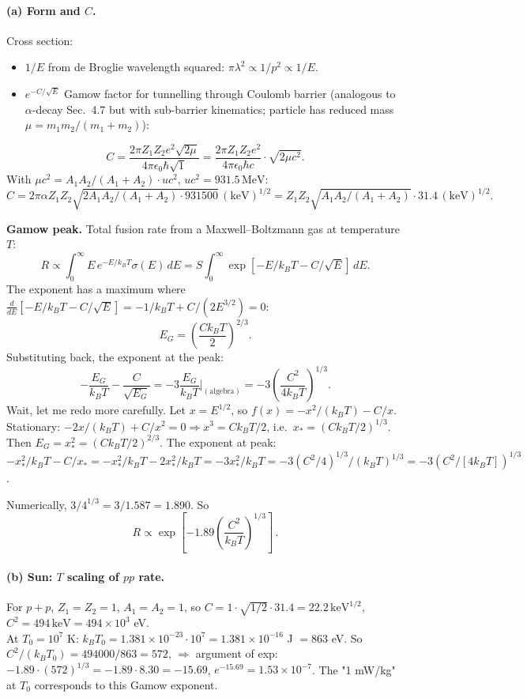 \documentclass[11pt]{article}
\newcommand{\MeV}{\,\mathrm{MeV}}
\begin{document}
\paragraph{(a) Form and $C$.} Cross section:
\begin{itemize}[itemsep=1pt]
\item $1/E$ from de Broglie wavelength squared: $\pi\lambda^{2}\propto 1/p^{2}\propto 1/E$.
\item $e^{-C/\sqrt E}$ Gamow factor for tunnelling through Coulomb barrier (analogous to $\alpha$-decay Sec.\ 4.7 but with sub-barrier kinematics; particle has reduced mass $\mu=m_1 m_2/(m_1+m_2)$):
\end{itemize}
\[
C=\frac{2\pi Z_1 Z_2 e^{2}\sqrt{2\mu}}{4\pi\epsilon_{0}\hbar\sqrt{1}}=\frac{2\pi Z_1 Z_2 e^{2}}{4\pi\epsilon_{0}\hbar c}\cdot\sqrt{2\mu c^{2}}.
\]
With $\mu c^{2}=A_1 A_2/(A_1+A_2)\cdot u c^{2}$, $u c^{2}=931.5\MeV$:
\[
C=2\pi\alpha Z_1 Z_2\sqrt{2 A_1 A_2/(A_1+A_2)\cdot 931500}\,\mathrm{(keV)}^{1/2}=Z_1 Z_2\sqrt{A_1 A_2/(A_1+A_2)}\cdot 31.4\,\mathrm{(keV)^{1/2}}.
\]
\checkmark

\textbf{Gamow peak.} Total fusion rate from a Maxwell--Boltzmann gas at temperature $T$:
\[
R\propto\!\int_0^\infty\!E\, e^{-E/k_B T}\sigma(E)\,dE=S\!\int_0^\infty\!\exp\!\left[-E/k_B T-C/\sqrt E\right]\,dE.
\]
The exponent has a maximum where $\frac{d}{dE}[-E/k_B T-C/\sqrt E]=-1/k_B T+C/(2 E^{3/2})=0$:
\[
E_G=\!\left(\frac{C k_B T}{2}\right)^{2/3}.
\]
Substituting back, the exponent at the peak:
\[
-\frac{E_G}{k_B T}-\frac{C}{\sqrt{E_G}}=-3\frac{E_G}{k_B T}\!\bigg|_{(\text{algebra})}=-3\!\left(\frac{C^{2}}{4 k_B T}\right)^{1/3}\!.
\]
Wait, let me redo more carefully. Let $x=E^{1/2}$, so $f(x)=-x^{2}/(k_B T)-C/x$. Stationary: $-2x/(k_B T)+C/x^{2}=0\Rightarrow x^{3}=C k_B T/2$, i.e.\ $x_*=(C k_B T/2)^{1/3}$. Then $E_G=x_*^{2}=(C k_B T/2)^{2/3}$. The exponent at peak: $-x_*^{2}/k_B T-C/x_*=-x_*^{2}/k_B T-2 x_*^{2}/k_B T=-3 x_*^{2}/k_B T=-3(C^{2}/4)^{1/3}/(k_B T)^{1/3}=-3(C^{2}/[4 k_B T])^{1/3}$.

Numerically, $3/4^{1/3}=3/1.587=1.890$. So
\[
\boxed{\;R\propto\exp\!\left[-1.89\!\left(\frac{C^{2}}{k_B T}\right)^{1/3}\right]\,.\;}
\]

\paragraph{(b) Sun: $T$ scaling of $pp$ rate.} For $p+p$, $Z_1=Z_2=1$, $A_1=A_2=1$, so $C=1\cdot\sqrt{1/2}\cdot 31.4=22.2\,\mathrm{keV}^{1/2}$, $C^{2}=494\,\mathrm{keV}=494\times 10^{3}$ eV.\\
At $T_0=10^{7}$ K: $k_B T_0=1.381\times 10^{-23}\cdot 10^{7}=1.381\times 10^{-16}$ J $=863$ eV. So $C^{2}/(k_B T_0)=494000/863=572$, $\Rightarrow$ argument of exp: $-1.89\cdot(572)^{1/3}=-1.89\cdot 8.30=-15.69$, $e^{-15.69}=1.53\times 10^{-7}$. The "1 mW/kg" at $T_0$ corresponds to this Gamow exponent.
\end{document}
